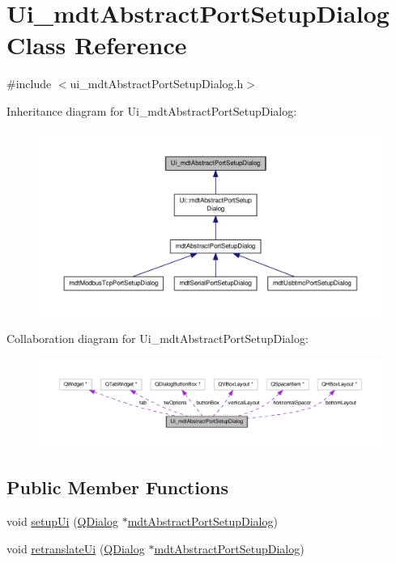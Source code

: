 \hypertarget{class_ui__mdt_abstract_port_setup_dialog}{\section{Ui\-\_\-mdt\-Abstract\-Port\-Setup\-Dialog Class Reference}
\label{class_ui__mdt_abstract_port_setup_dialog}
}


{\ttfamily \#include $<$ui\-\_\-mdt\-Abstract\-Port\-Setup\-Dialog.\-h$>$}



Inheritance diagram for Ui\-\_\-mdt\-Abstract\-Port\-Setup\-Dialog\-:
\nopagebreak
\begin{figure}[H]
\begin{center}
\leavevmode
\includegraphics[width=350pt]{class_ui__mdt_abstract_port_setup_dialog__inherit__graph}
\end{center}
\end{figure}


Collaboration diagram for Ui\-\_\-mdt\-Abstract\-Port\-Setup\-Dialog\-:
\nopagebreak
\begin{figure}[H]
\begin{center}
\leavevmode
\includegraphics[width=350pt]{class_ui__mdt_abstract_port_setup_dialog__coll__graph}
\end{center}
\end{figure}
\subsection*{Public Member Functions}
\begin{DoxyCompactItemize}
\item 
void \hyperlink{class_ui__mdt_abstract_port_setup_dialog_a5b5b735fa4c40a033a360f4311e193e5}{setup\-Ui} (\hyperlink{class_q_dialog}{Q\-Dialog} $\ast$\hyperlink{classmdt_abstract_port_setup_dialog}{mdt\-Abstract\-Port\-Setup\-Dialog})
\item 
void \hyperlink{class_ui__mdt_abstract_port_setup_dialog_ad28958e37ce2490217af7b0c5f02490e}{retranslate\-Ui} (\hyperlink{class_q_dialog}{Q\-Dialog} $\ast$\hyperlink{classmdt_abstract_port_setup_dialog}{mdt\-Abstract\-Port\-Setup\-Dialog})
\end{DoxyCompactItemize}
